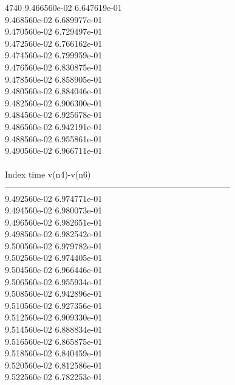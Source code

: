 4740	9.466560e-02	6.647619e-01	\\ 	9.468560e-02	6.689977e-01	\\ 	9.470560e-02	6.729497e-01	\\ 	9.472560e-02	6.766162e-01	\\ 	9.474560e-02	6.799959e-01	\\ 	9.476560e-02	6.830875e-01	\\ 	9.478560e-02	6.858905e-01	\\ 	9.480560e-02	6.884046e-01	\\ 	9.482560e-02	6.906300e-01	\\ 	9.484560e-02	6.925678e-01	\\ 	9.486560e-02	6.942191e-01	\\ 	9.488560e-02	6.955861e-01	\\ 	9.490560e-02	6.966711e-01	\\ \hline
\\ \hline
Index   time            v(n4)-v(n6)     \\ \hline
--------------------------------------------------------------------------------\\ 	9.492560e-02	6.974771e-01	\\ 	9.494560e-02	6.980073e-01	\\ 	9.496560e-02	6.982651e-01	\\ 	9.498560e-02	6.982542e-01	\\ 	9.500560e-02	6.979782e-01	\\ 	9.502560e-02	6.974405e-01	\\ 	9.504560e-02	6.966446e-01	\\ 	9.506560e-02	6.955934e-01	\\ 	9.508560e-02	6.942896e-01	\\ 	9.510560e-02	6.927356e-01	\\ 	9.512560e-02	6.909330e-01	\\ 	9.514560e-02	6.888834e-01	\\ 	9.516560e-02	6.865875e-01	\\ 	9.518560e-02	6.840459e-01	\\ 	9.520560e-02	6.812586e-01	\\ 	9.522560e-02	6.782253e-01	\\ \hline
